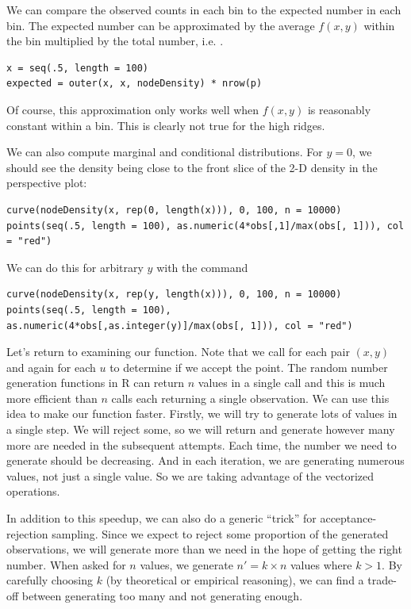 \documentclass{article}
\begin{document}
\begin{description}
We can compare the observed counts in each bin to the expected number
in each bin.  The expected number can be approximated by the average
$f(x, y)$ within the bin multiplied by the total number, i.e.
.
\begin{verbatim}
x = seq(.5, length = 100)
expected = outer(x, x, nodeDensity) * nrow(p)
\end{verbatim}
Of course, this approximation only works well when 
$f(x,y)$ is reasonably constant within a bin.
This is clearly not true for the high ridges.


We can also compute marginal and conditional distributions.  For $y =
0$, we should see the density being close to the front slice of the 2-D
density in the perspective plot:
\begin{verbatim}
curve(nodeDensity(x, rep(0, length(x))), 0, 100, n = 10000)
points(seq(.5, length = 100), as.numeric(4*obs[,1]/max(obs[, 1])), col = "red")
\end{verbatim}
We can do this for arbitrary $y$
with the command
\begin{verbatim}
curve(nodeDensity(x, rep(y, length(x))), 0, 100, n = 10000)
points(seq(.5, length = 100), as.numeric(4*obs[,as.integer(y)]/max(obs[, 1])), col = "red")
\end{verbatim}


Let's return to examining our function.  Note that we call
 for each pair $(x, y)$ and again for each $u$ to
determine if we accept the point.  The random number generation
functions in R can return $n$ values in a single call and this is much
more efficient than $n$ calls each returning a single observation.  We
can use this idea to make our function faster.  Firstly, we will try
to generate lots of values in a single step.  We will reject some, so
we will return and generate however many more are needed in the
subsequent attempts.  Each time, the number we need to generate should
be decreasing.  And in each iteration, we are generating numerous
values, not just a single value. So we are taking advantage of the
vectorized operations.

In addition to this speedup, we can also do a generic ``trick'' for
acceptance-rejection sampling.  Since we expect to reject some
proportion of the generated observations, we will generate more than
we need in the hope of getting the right number.  When asked for $n$
values, we generate $n' = k \times n$ values where $k > 1$.  By
carefully choosing $k$ (by theoretical or empirical reasoning), we can
find a trade-off between generating too many and not generating
enough.



\end{description}
\end{document}
